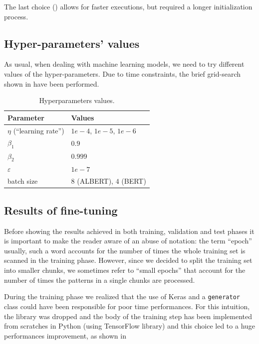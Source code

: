 \documentclass[10pt,hidelinks]{article}
\def\colOne{white}
\def\colTwo{pblue!10}
\def\colHea{pblue!35}
\begin{document}
The last choice () allows for faster executions, but required a longer initialization process.

\subsection{Hyper-parameters' values}
As usual, when dealing with machine learning models, we need to try different values of the hyper-parameters. Due to time constraints, the brief grid-search shown in  have been performed.

\begin{table}[ht!]
	\footnotesize\centering
	\rowcolors{2}{\colOne}{\colTwo}
	\begin{tabular}{|l|p{60mm}|}
		\hline\rowcolor{\colHea} Parameter & Values\\\hline\hline
		$ \eta $ (``learning rate'') & $ 1e-4$, $1e-5$, $1e-6$ \\
		$\beta_1$ & $0.9$\\
		$\beta_2$ & $0.999$\\
		$\varepsilon$ & $1e-7$\\
		batch size & $8$ (ALBERT), $4$ (BERT)\\
		\end{tabular}
	\caption{Hyperparameters values.}\label{tab:grid_search}
\end{table}

\subsection{Results of fine-tuning}
Before showing the results achieved in both training, validation and test phases it is important to make the reader aware of an abuse of notation: the term ``epoch'' usually, such a word accounts for the number of times the whole training set is scanned in the training phase.
However, since we decided to split the training set into smaller chunks, we sometimes refer to ``small epochs'' that account for the number of times the patterns in a single chunks are processed.


During the training phase we realized that the use of Keras and a \texttt{generator} class  could have been responsible for poor time performances.
For this intuition, the library was dropped and the body of the training step has been implemented from scratches in Python (using TensorFlow library) and this choice led to a huge performances improvement, as shown in 
\end{document}

